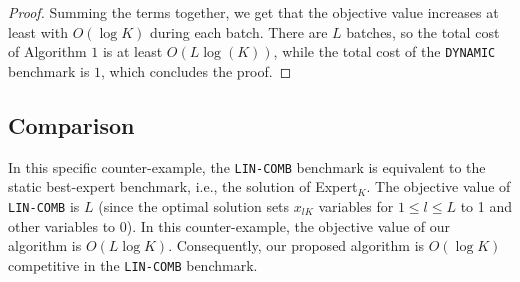 \begin{proof}
     Summing the terms together, we get that the objective value increases at least with $O(\log K)$ during each batch. There are $L$ batches, so the total cost of Algorithm $1$ is at least $O(L \log(K))$,
     while the total cost of the \texttt{DYNAMIC} benchmark is $1$, which concludes the proof.
\end{proof}

\subsection{Comparison}

In this specific counter-example, the \texttt{LIN-COMB} benchmark is equivalent to the static best-expert benchmark, i.e., the solution of Expert$_K$. The objective value of \texttt{LIN-COMB} is $L$ (since the optimal solution sets $x_{lK}$ variables for $1 \leq l \leq L$  to 1 and other variables to 0). In this counter-example, the objective value of our algorithm is $O(L\log K)$. Consequently, our proposed algorithm is $O(\log K)$ competitive in the \texttt{LIN-COMB} benchmark.

